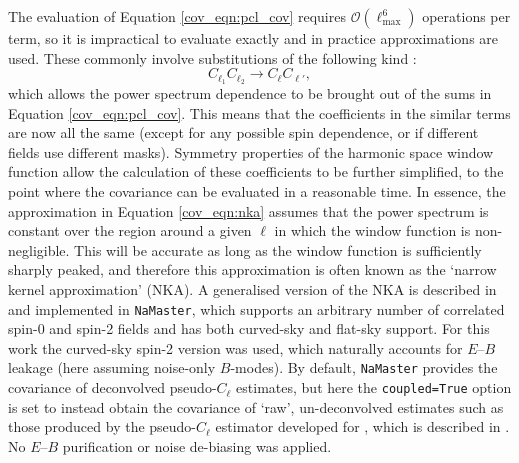 The evaluation of Equation \eqref{cov_eqn:pcl_cov} requires $\mathcal{O}(\ell_\text{max}^6)$ operations per term, so it is impractical to evaluate exactly and in practice approximations are used. These commonly involve substitutions of the following kind \citep{Efstathiou2004,Brown2005,Garcia-Garcia2019}:
\begin{equation}
C_{\ell_1} C_{\ell_2} \rightarrow C_\ell C_{\ell'},
\label{cov_eqn:nka}
\end{equation}
which allows the power spectrum dependence to be brought out of the sums in Equation \eqref{cov_eqn:pcl_cov}. This means that the coefficients in the similar terms are now all the same (except for any possible spin dependence, or if different fields use different masks). Symmetry properties of the harmonic space window function allow the calculation of these coefficients to be further simplified, to the point where the covariance can be evaluated in a reasonable time. In essence, the approximation in Equation \eqref{cov_eqn:nka} assumes that the power spectrum is constant over the region around a given $\ell$ in which the window function is non-negligible. This will be accurate as long as the window function is sufficiently sharply peaked, and therefore this approximation is often known as the `narrow kernel approximation' (NKA).
A generalised version of the NKA is described in \citet{Garcia-Garcia2019} and implemented in \texttt{NaMaster}, which supports an arbitrary number of correlated spin-0 and spin-2 fields and has both curved-sky and flat-sky support. For this work the curved-sky spin-2 version was used, which naturally accounts for $E$--$B$ leakage (here assuming noise-only $B$-modes). By default, \texttt{NaMaster} provides the covariance of deconvolved pseudo-$C_\ell$ estimates, but here the \texttt{coupled=True} option is set to instead obtain the covariance of `raw', un-deconvolved estimates such as those produced by the pseudo-$C_\ell$ estimator developed for \Euclid{}, which is described in \citet{Loureiro2021}. No $E$--$B$ purification or noise de-biasing was applied.


